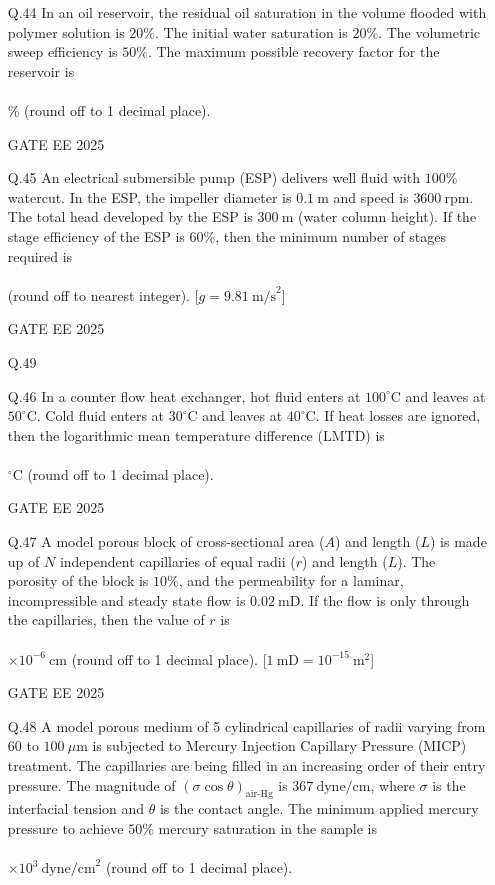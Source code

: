 \documentclass{article}
\begin{document}
\begin{enumerate}[leftmargin=*,series=q]
\vspace{0.5cm}
\item[Q.44] In an oil reservoir, the residual oil saturation in the volume flooded with polymer solution is $20\%$.  
The initial water saturation is $20\%$.  
The volumetric sweep efficiency is $50\%$.  
The maximum possible recovery factor for the reservoir is \\\\ \% (round off to 1 decimal place).  

GATE EE 2025
\vspace{0.5cm}
\item[Q.45] An electrical submersible pump (ESP) delivers well fluid with $100\%$ watercut.  
In the ESP, the impeller diameter is $0.1 \ \text{m}$ and speed is $3600 \ \text{rpm}$.  
The total head developed by the ESP is $300 \ \text{m}$ (water column height).  
If the stage efficiency of the ESP is $60\%$, then the minimum number of stages required is \\\\ (round off to nearest integer).  
[$g = 9.81 \ \text{m/s}^2$]  

GATE EE 2025
\item[Q.49] 
\item[Q.46] In a counter flow heat exchanger, hot fluid enters at $100^\circ \text{C}$ and leaves at $50^\circ \text{C}$.  
Cold fluid enters at $30^\circ \text{C}$ and leaves at $40^\circ \text{C}$.  
If heat losses are ignored, then the logarithmic mean temperature difference (LMTD) is \\\\ $^\circ \text{C}$ (round off to 1 decimal place).  

GATE EE 2025

\vspace{0.5cm}
\item[Q.47] A model porous block of cross-sectional area ($A$) and length ($L$) is made up of $N$ independent capillaries of equal radii ($r$) and length ($L$).  
The porosity of the block is $10\%$, and the permeability for a laminar, incompressible and steady state flow is $0.02 \ \text{mD}$.  
If the flow is only through the capillaries, then the value of $r$ is \\\\ $\times 10^{-6} \ \text{cm}$ (round off to 1 decimal place).  
[$1 \ \text{mD} = 10^{-15} \ \text{m}^2$]  

GATE EE 2025
\vspace{0.5cm}
\item[Q.48] A model porous medium of 5 cylindrical capillaries of radii varying from $60$ to $100 \ \mu\text{m}$ is subjected to Mercury Injection Capillary Pressure (MICP) treatment.  
The capillaries are being filled in an increasing order of their entry pressure.  
The magnitude of $(\sigma \cos \theta)_{\text{air-Hg}}$ is $367 \ \text{dyne/cm}$, where $\sigma$ is the interfacial tension and $\theta$ is the contact angle.  
The minimum applied mercury pressure to achieve $50\%$ mercury saturation in the sample is \\\\ $\times 10^3 \ \text{dyne/cm}^2$ (round off to 1 decimal place).  



\end{enumerate}
\end{document}
